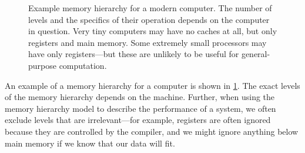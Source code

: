 \begin{figure}
  \centering

  \begin{center}
  \end{center}

  \caption{Example memory hierarchy for a modern computer.  The number
    of levels and the specifics of their operation depends on the
    computer in question.  Very tiny computers may have no caches at
    all, but only registers and main memory.  Some extremely small
    processors may have only registers---but these are unlikely to be
    useful for general-purpose computation.}
  \label{fig:memory-hierarchy}
\end{figure}

An example of a memory hierarchy for a computer is shown in
\cref{fig:memory-hierarchy}.  The exact levels of the memory hierarchy
depends on the machine.  Further, when using the memory hierarchy
model to describe the performance of a system, we often exclude levels
that are irrelevant---for example, registers are often ignored because
they are controlled by the compiler, and we might ignore anything
below main memory if we know that our data will fit.

